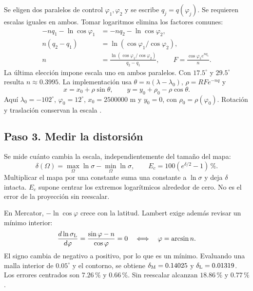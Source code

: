Se eligen dos paralelos de control $\varphi_1,\varphi_2$ y se escribe $q_j=q(\varphi_j)$. Se requieren escalas iguales en ambos. Tomar logaritmos elimina los factores comunes:
\begin{equation}
 \begin{aligned}
 -nq_1-\ln\cos\varphi_1&=-nq_2-\ln\cos\varphi_2,\\
 n(q_2-q_1)&=\ln(\cos\varphi_1/\cos\varphi_2),\\
 n&=\frac{\ln(\cos\varphi_1/\cos\varphi_2)}{q_2-q_1},\qquad
 F=\frac{\cos\varphi_1 e^{nq_1}}{n}.
 \end{aligned}\label{eq:lambert_n}
\end{equation}
La última elección impone escala uno en ambos paralelos. Con $17.5^\circ$ y $29.5^\circ$ resulta $n\approx0.3995$. La implementación usa $\theta=n(\lambda-\lambda_0)$, $\rho=RF e^{-nq}$ y
\begin{equation}
 x=x_0+\rho\sin\theta,\qquad y=y_0+\rho_0-\rho\cos\theta.
 \label{eq:lcc_xy}
\end{equation}
Aquí $\lambda_0=-102^\circ$, $\varphi_0=12^\circ$, $x_0=2500000$ m y $y_0=0$, con $\rho_0=\rho(\varphi_0)$. Rotación y traslación conservan la escala \cite{snyder1987,proj}.

\subsection{Paso 3. Medir la distorsión}
Se mide cuánto cambia la escala, independientemente del tamaño del mapa:
\begin{equation}
 \delta(\Omega)=\max_\Omega\ln\sigma-\min_\Omega\ln\sigma,
 \qquad E_c=100(e^{\delta/2}-1)\,\%.
 \label{eq:delta}
\end{equation}
Multiplicar el mapa por una constante suma una constante a $\ln\sigma$ y deja $\delta$ intacta. $E_c$ supone centrar los extremos logarítmicos alrededor de cero. No es el error de la proyección sin reescalar.

En Mercator, $-\ln\cos\varphi$ crece con la latitud. Lambert exige además revisar un mínimo interior:
\begin{equation}
 \frac{d\ln\sigma_{\rm L}}{d\varphi}
 =\frac{\sin\varphi-n}{\cos\varphi}=0
 \quad\Longleftrightarrow\quad \varphi=\arcsin n.
 \label{eq:lcc_min}
\end{equation}
El signo cambia de negativo a positivo, por lo que es un mínimo. Evaluando una malla interior de $0.05^\circ$ y el contorno, se obtiene $\delta_{\rm M}=0.14025$ y $\delta_{\rm L}=0.01319$. Los errores centrados son $7.26\,\%$ y $0.66\,\%$. Sin reescalar alcanzan $18.86\,\%$ y $0.77\,\%$.

